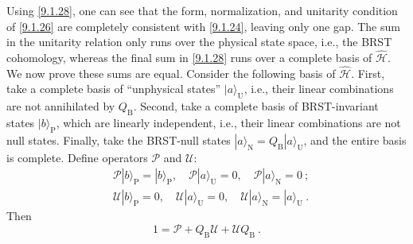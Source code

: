 Using \eqref{9.1.28}, one can see that the form, normalization, and unitarity condition of \eqref{9.1.26} are completely consistent with \eqref{9.1.24}, leaving only one gap.
The sum in the unitarity relation only runs over the physical state space, i.e., the BRST cohomology, whereas the final sum in \eqref{9.1.28} runs over a complete basis of $\hat{\mathscr{H}}$. 
We now prove these sums are equal. Consider the following basis of $\hat{\mathscr{H}}$. 
First, take a complete basis of ``unphysical states'' $|a\rangle_{\mathrm{U}}$, i.e., their linear combinations are not annihilated by $Q_{\mathrm{B}}$.
Second, take a complete basis of BRST-invariant states $|b\rangle_{\mathrm{P}}$, which are linearly independent, i.e., their linear combinations are not null states.
Finally, take the BRST-null states $|a\rangle_{\mathrm{N}}=Q_{\mathrm{B}}|a\rangle_{\mathrm{U}}$, and the entire basis is complete.
Define operators $\mathscr{P}$ and $\mathscr{U}$:
\begin{subequations} \label{9.1.30}
	\begin{align}
		&\mathscr{P}|b\rangle_{\mathrm{P}} = |b\rangle_{\mathrm{P}}, \quad \mathscr{P}|a\rangle_{\mathrm{U}}=0, \quad 
		\mathscr{P}|a\rangle_{\mathrm{N}} = 0 \:;
		\label{9.1.30a} \\
		&\mathscr{U}|b\rangle_{\mathrm{P}} = 0, \quad \mathscr{U}|a\rangle_{\mathrm{U}}=0, \quad 
		\mathscr{U}|a\rangle_{\mathrm{N}} = |a\rangle_{\mathrm{U}} \:. \label{9.1.30b}
	\end{align}
\end{subequations}
Then
\begin{equation}
	1=\mathscr{P}+Q_{\mathrm{B}} \mathscr{U}+\mathscr{U} Q_{\mathrm{B}} \:. \label{9.1.31}
\end{equation}
